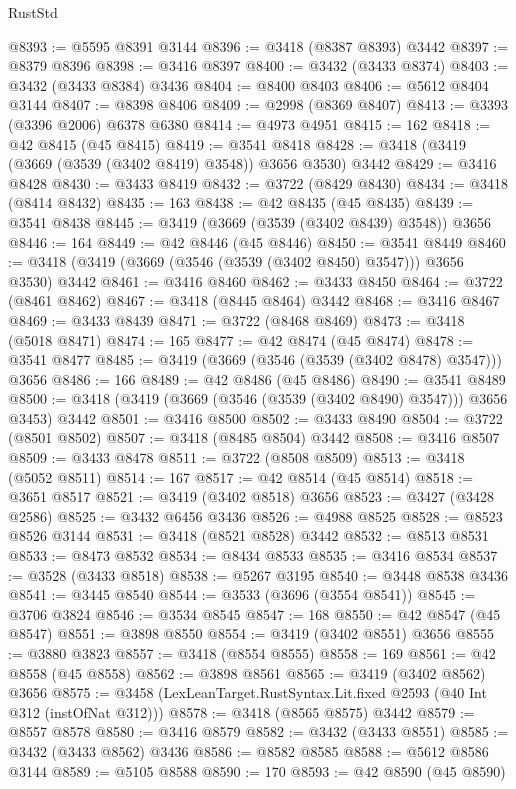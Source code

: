 \begin{lexlean}{RustStd}
\begin{coremodule}
@8393 := @5595 @8391 @3144
@8396 := @3418 (@8387 @8393) @3442
@8397 := @8379 @8396
@8398 := @3416 @8397
@8400 := @3432 (@3433 @8374)
@8403 := @3432 (@3433 @8384) @3436
@8404 := @8400 @8403
@8406 := @5612 @8404 @3144
@8407 := @8398 @8406
@8409 := @2998 (@8369 @8407)
@8413 := @3393 (@3396 @2006) @6378 @6380
@8414 := @4973 @4951
@8415 := 162
@8418 := @42 @8415 (@45 @8415)
@8419 := @3541 @8418
@8428 := @3418 (@3419 (@3669 (@3539 (@3402 @8419) @3548)) @3656 @3530) @3442
@8429 := @3416 @8428
@8430 := @3433 @8419
@8432 := @3722 (@8429 @8430)
@8434 := @3418 (@8414 @8432)
@8435 := 163
@8438 := @42 @8435 (@45 @8435)
@8439 := @3541 @8438
@8445 := @3419 (@3669 (@3539 (@3402 @8439) @3548)) @3656
@8446 := 164
@8449 := @42 @8446 (@45 @8446)
@8450 := @3541 @8449
@8460 := @3418 (@3419 (@3669 (@3546 (@3539 (@3402 @8450) @3547))) @3656 @3530) @3442
@8461 := @3416 @8460
@8462 := @3433 @8450
@8464 := @3722 (@8461 @8462)
@8467 := @3418 (@8445 @8464) @3442
@8468 := @3416 @8467
@8469 := @3433 @8439
@8471 := @3722 (@8468 @8469)
@8473 := @3418 (@5018 @8471)
@8474 := 165
@8477 := @42 @8474 (@45 @8474)
@8478 := @3541 @8477
@8485 := @3419 (@3669 (@3546 (@3539 (@3402 @8478) @3547))) @3656
@8486 := 166
@8489 := @42 @8486 (@45 @8486)
@8490 := @3541 @8489
@8500 := @3418 (@3419 (@3669 (@3546 (@3539 (@3402 @8490) @3547))) @3656 @3453) @3442
@8501 := @3416 @8500
@8502 := @3433 @8490
@8504 := @3722 (@8501 @8502)
@8507 := @3418 (@8485 @8504) @3442
@8508 := @3416 @8507
@8509 := @3433 @8478
@8511 := @3722 (@8508 @8509)
@8513 := @3418 (@5052 @8511)
@8514 := 167
@8517 := @42 @8514 (@45 @8514)
@8518 := @3651 @8517
@8521 := @3419 (@3402 @8518) @3656
@8523 := @3427 (@3428 @2586)
@8525 := @3432 @6456 @3436
@8526 := @4988 @8525
@8528 := @8523 @8526 @3144
@8531 := @3418 (@8521 @8528) @3442
@8532 := @8513 @8531
@8533 := @8473 @8532
@8534 := @8434 @8533
@8535 := @3416 @8534
@8537 := @3528 (@3433 @8518)
@8538 := @5267 @3195
@8540 := @3448 @8538 @3436
@8541 := @3445 @8540
@8544 := @3533 (@3696 (@3554 @8541))
@8545 := @3706 @3824
@8546 := @3534 @8545
@8547 := 168
@8550 := @42 @8547 (@45 @8547)
@8551 := @3898 @8550
@8554 := @3419 (@3402 @8551) @3656
@8555 := @3880 @3823
@8557 := @3418 (@8554 @8555)
@8558 := 169
@8561 := @42 @8558 (@45 @8558)
@8562 := @3898 @8561
@8565 := @3419 (@3402 @8562) @3656
@8575 := @3458 (LexLeanTarget.RustSyntax.Lit.fixed @2593 (@40 Int @312 (instOfNat @312)))
@8578 := @3418 (@8565 @8575) @3442
@8579 := @8557 @8578
@8580 := @3416 @8579
@8582 := @3432 (@3433 @8551)
@8585 := @3432 (@3433 @8562) @3436
@8586 := @8582 @8585
@8588 := @5612 @8586 @3144
@8589 := @5105 @8588
@8590 := 170
@8593 := @42 @8590 (@45 @8590)

\end{coremodule}
\end{lexlean}
